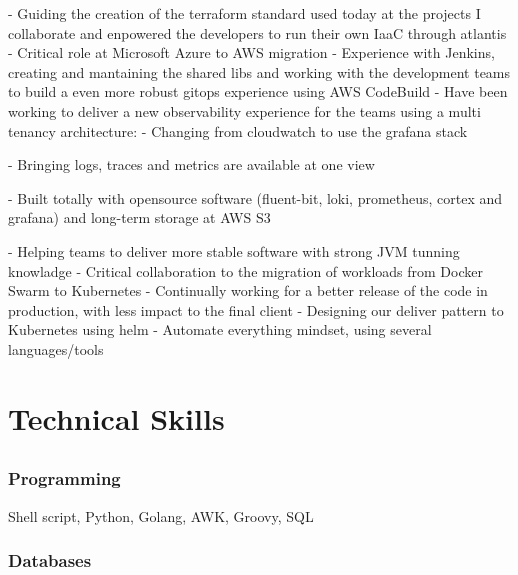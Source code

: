 \documentclass{article}
\begin{document}
- Guiding the creation of the terraform standard used today at the projects I collaborate and enpowered the developers to run their own IaaC through atlantis \newline
- Critical role at Microsoft Azure to AWS migration \newline
- Experience with Jenkins, creating and mantaining the shared libs and working with the development teams to build a even more robust gitops experience using AWS CodeBuild \newline
- Have been working to deliver a new observability experience for the teams using a multi tenancy architecture: \newline
    - Changing from cloudwatch to use the grafana stack \par
    - Bringing logs, traces and metrics are available at one view \par
    - Built totally with opensource software (fluent-bit, loki, prometheus, cortex and grafana) and long-term storage at AWS S3\par
- Helping teams to deliver more stable software with strong JVM tunning knowladge \newline
- Critical collaboration to the migration of workloads from Docker Swarm to Kubernetes \newline
- Continually working for a better release of the code in production, with less impact to the final client \newline
- Designing our deliver pattern to Kubernetes using helm  \newline
- Automate everything mindset, using several languages/tools \newline

\section{Technical Skills}

\subsection{}

\subsubsection{Programming}

Shell script, Python, Golang, AWK, Groovy, SQL

\subsubsection{Databases}
\end{document}
